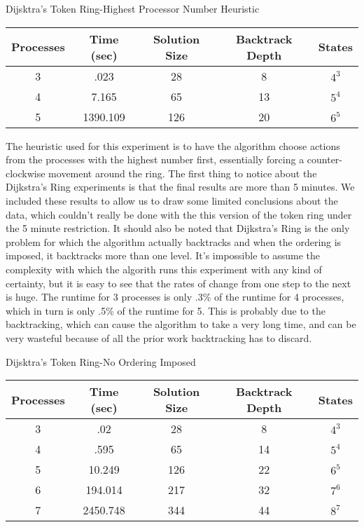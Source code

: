 \begin{center}
Dijsktra's Token Ring-Highest Processor Number Heuristic \\
\begin{tabular}{|c|c|c|c|c|}
\hline
 Processes & Time (sec) & Solution Size & Backtrack Depth & States \\
\hline
 3 & .023 & 28 & 8 & $4^{3}$         \\
 4 & 7.165 & 65 & 13 & $5^{4}$          \\
 5 & 1390.109 & 126 & 20 & $6^{5}$    \\
\hline
\end{tabular}
\end{center}

The heuristic used for this experiment is to have the algorithm choose actions from the processes with
the highest number first, essentially forcing a counter-clockwise movement around the ring.  The first
thing to notice about the Dijkstra's Ring experiments is that the final results are more than 5 minutes.
We included these results to allow us to draw some limited conclusions about the data, which couldn't
really be done with the this version of the token ring under the 5 minute restriction.  It should also be
noted that Dijkstra's Ring is the only problem for which the algorithm actually backtracks and when the
ordering is imposed, it backtracks more than one level.  It's impossible to assume the complexity with
which the algorith runs this experiment with any kind of certainty, but it is easy to see that the rates
of change from one step to the next is huge.  The runtime for 3 processes is only .3\% of the runtime
for 4 processes, which in turn is only .5\% of the runtime for 5.  This is probably due to the
backtracking, which can cause the algorithm to take a very long time, and can be very wasteful because
of all the prior work backtracking has to discard.

\newpage

\begin{center}
Dijsktra's Token Ring-No Ordering Imposed \\
\begin{tabular}{|c|c|c|c|c|}
\hline
 Processes & Time (sec) & Solution Size & Backtrack Depth & States \\
\hline
 3 & .02 & 28 & 8 & $4^{3}$         \\
 4 & .595 & 65 & 14 & $5^{4}$          \\
 5 & 10.249 & 126 & 22 & $6^{5}$        \\
 6 & 194.014 & 217 & 32 & $7^{6}$      \\
 7 & 2450.748 & 344 & 44 & $8^{7}$    \\
\hline
\end{tabular}
\end{center}

